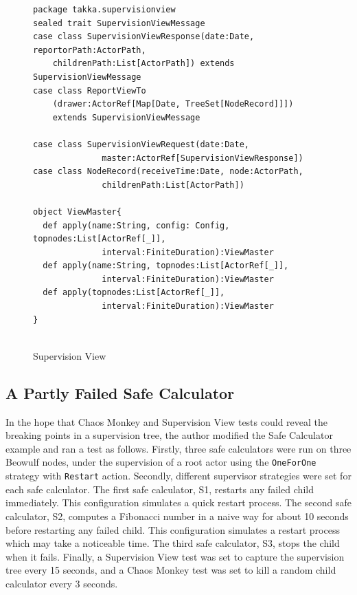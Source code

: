 \begin{figure}[!h]

\begin{lstlisting}
package takka.supervisionview
sealed trait SupervisionViewMessage
case class SupervisionViewResponse(date:Date, reportorPath:ActorPath, 
    childrenPath:List[ActorPath]) extends SupervisionViewMessage
case class ReportViewTo
    (drawer:ActorRef[Map[Date, TreeSet[NodeRecord]]]) 
    extends SupervisionViewMessage

case class SupervisionViewRequest(date:Date,  
              master:ActorRef[SupervisionViewResponse])
case class NodeRecord(receiveTime:Date, node:ActorPath, 
              childrenPath:List[ActorPath]) 

object ViewMaster{
  def apply(name:String, config: Config, topnodes:List[ActorRef[_]], 
              interval:FiniteDuration):ViewMaster
  def apply(name:String, topnodes:List[ActorRef[_]], 
              interval:FiniteDuration):ViewMaster  
  def apply(topnodes:List[ActorRef[_]], 
              interval:FiniteDuration):ViewMaster
}


\end{lstlisting}
\caption{Supervision View}
\label{supervision_view}
\end{figure}



\newpage 



\subsection{A Partly Failed Safe Calculator}
\label{calculator_chaos_test}

In the hope that Chaos Monkey and Supervision View tests could reveal 
the breaking points in a supervision tree, the author modified the Safe 
Calculator example and ran a test as follows.  Firstly, three 
safe calculators were run on three Beowulf nodes, under the supervision of a 
root actor using the {\tt OneForOne} strategy with {\tt Restart} action.  
Secondly, different supervisor strategies were set for each safe calculator.  
The first safe calculator, S1, restarts any failed child immediately.  This 
configuration simulates a quick restart process. The second safe calculator, 
S2, computes a Fibonacci number in a naive way for about 10 seconds before 
restarting any failed child.  This configuration simulates 
a restart process which may take a noticeable time.  The third safe calculator, 
S3, stops the child when it fails.  Finally, a Supervision View test was set to 
capture the supervision tree every 15 seconds, and a Chaos Monkey 
test was set to kill a random child calculator every 3 seconds.

